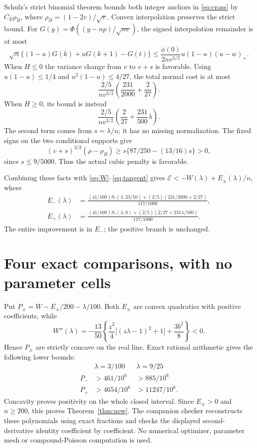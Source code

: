 \documentclass[11pt,a4paper]{article}
\begin{document}
Schulz's strict binomial theorem \cite[Theorem 1]{Schulz} bounds both integer
anchors in \eqref{eq:cross} by $C_E\rho_B$, where
$\rho_B=(1-2v)/\sqrt v$. Convex interpolation preserves the strict bound.
For $G(y)=\Phi((y-np)/\sqrt{nv})$, the signed interpolation remainder is
at most
\[
 \sqrt n\{(1-u)G(k)+uG(k+1)-G(t)\}
 \le\frac{\phi(0)}{2nv^{3/2}}u(1-u)(u-w)_+.
\]
When $H\le0$ the variance change from $v$ to $v+s$ is favorable.
Using $u(1-u)\le1/4$ and $u^2(1-u)\le4/27$, the total normal cost is
at most
\[
 \frac{2/5}{nv^{3/2}}\left(\frac{231}{2000}+\frac2{27}\right).
\]
When $H\ge0$, its bound is instead
\[
 \frac{2/5}{nv^{3/2}}\left(\frac2{27}+\frac{231}{500}\lambda\right).
\]
The second term comes from $s=\lambda/n$; it has no missing normalization.
The fixed signs on the two conditional supports give
\[
 (v+s)^{3/2}(\rho-\rho_B)
 \ge s\{87/250-(13/16)s\}>0,
\]
since $s\le9/5000$. Thus the actual cubic penalty is favorable.

Combining these facts with \eqref{eq:W}--\eqref{eq:tangent} gives
$\mathcal E<-W(\lambda)+E_\pm(\lambda)/n$, where
\begin{align*}
 E_-(\lambda)&=
 \frac{(41/100)S_*(\lambda,23/50)+(2/5)(231/2000+2/27)}{117/1000},\\
 E_+(\lambda)&=
 \frac{(41/100)S_*(\lambda,0)+(2/5)(2/27+231\lambda/500)}{117/1000}.
\end{align*}
The entire improvement is in $E_-$; the positive branch is unchanged.

\section{Four exact comparisons, with no parameter cells}
Put $P_\pm=W-E_\pm/200-\lambda/100$. Both $E_\pm$ are convex
quadratics with positive coefficients, while
\[
 W''(\lambda)=-\frac{13}{50}
 \left\{\frac{z^2}{4}\bigl[(z\lambda-1)^2+1\bigr]
                         +\frac{3b^2}{8}\right\}<0.
\]
Hence $P_\pm$ are strictly concave on the real line. Exact rational
arithmetic gives the following lower bounds:
\[
\begin{array}{c|cc}
 &\lambda=3/100&\lambda=9/25\\\hline
 P_-&>461/10^6&>885/10^6\\
 P_+&>4654/10^6&>11247/10^6.
\end{array}
\]
Concavity proves positivity on the whole closed interval. Since $E_\pm>0$
and $n\ge200$, this proves Theorem~\ref{thm:new}.
The companion checker reconstructs these polynomials using exact fractions
and checks the displayed second-derivative identity coefficient by coefficient.
No numerical optimizer, parameter mesh or compound-Poisson computation is used.
\end{document}
